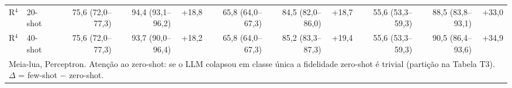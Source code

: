 \begin{table}[htbp]
\begin{tabular}{llrrrrrrrrr}
R$^4$ & 20-shot & 75,6 (72,0–77,3) & 94,4 (93,1–96,2) & +18,8 & 65,8 (64,0–67,3) & 84,5 (82,0–86,0) & +18,7 & 55,6 (53,3–59,3) & 88,5 (83,8–93,1) & +33,0 \\
R$^4$ & 40-shot & 75,6 (72,0–77,3) & 93,7 (90,0–96,4) & +18,2 & 65,8 (64,0–67,3) & 85,2 (83,3–87,3) & +19,4 & 55,6 (53,3–59,3) & 90,5 (86,4–93,6) & +34,9 \\
\bottomrule
\multicolumn{11}{p{0.95\linewidth}}{\footnotesize Meia-lua, Perceptron. Atenção ao zero-shot: se o LLM colapsou em classe única a fidelidade zero-shot é trivial (partição na Tabela T3). $\Delta$ = few-shot $-$ zero-shot.} \\
\end{tabular}
\end{table}
